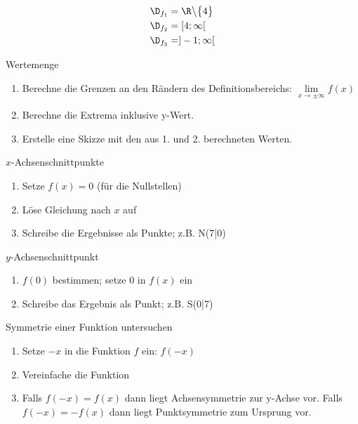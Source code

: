 \documentclass[paper=a6,landscape,ngerman,twoside=true,fontsize=12pt]{scrartcl}
\begin{document}
\begin{antwort}
	\begin{align*}
	   	  \D_{f_1}&=\R\big\backslash\big\{4\big\} \\
		  \D_{f_2}&=[4;\infty[ \\
		  \D_{f_3}&=]-1;\infty[ \\
	\end{align*}
\end{antwort}
\begin{frage}
	Wertemenge
\end{frage}
\begin{antwort}
	\begin{enumerate}
		\item Berechne die Grenzen an den Rändern des Definitionsbereichs: $\lim\limits_{x \rightarrow\pm\infty}{f(x)}$
		\item Berechne die Extrema inklusive y-Wert.
		\item Erstelle eine Skizze mit den aus 1. und 2. berechneten Werten.
	\end{enumerate}
\end{antwort}
\begin{frage}
	$x$-Achsenschnittpunkte
\end{frage}
\begin{antwort}
	\begin{enumerate}
		\item Setze $f(x)=0$ (für die Nullstellen)
		\item Löse Gleichung nach $x$ auf
		\item Schreibe die Ergebnisse als Punkte; z.B. N(7|0)
	\end{enumerate}
\end{antwort}
\begin{frage}
	$y$-Achsenschnittpunkt
\end{frage}
\begin{antwort}
	\begin{enumerate}
		\item $f(0)$ bestimmen; setze $0$ in $f(x)$ ein
		\item Schreibe das Ergebnis als Punkt; z.B. S(0|7)
	\end{enumerate}
\end{antwort}
\begin{frage}
	Symmetrie einer Funktion untersuchen
\end{frage}
\begin{antwort}
	\begin{enumerate}
		\item Setze $-x$ in die Funktion $f$ ein: $f(-x)$
		\item Vereinfache die Funktion
		\item Falls $f(-x)=f(x)$ dann liegt Achsensymmetrie zur y-Achse vor. Falls $f(-x)=-f(x)$ dann liegt Punktsymmetrie zum Ursprung vor.
	\end{enumerate}
\end{antwort}
\end{document}
